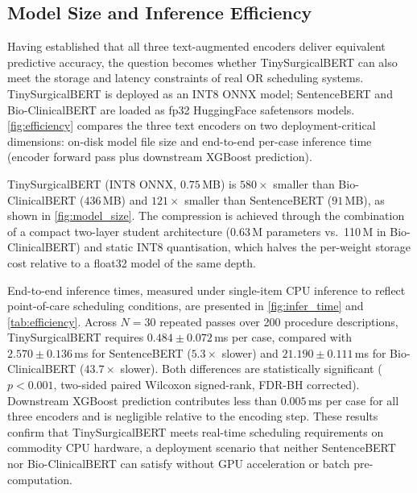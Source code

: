 \documentclass[3p]{elsarticle}
\begin{document}
\subsection{Model Size and Inference Efficiency}
\label{sec:runtime}

Having established that all three text-augmented encoders deliver equivalent predictive accuracy, the question becomes whether TinySurgicalBERT can also meet the storage and latency constraints of real OR scheduling systems. TinySurgicalBERT is deployed as an INT8 ONNX model; SentenceBERT and Bio-ClinicalBERT are loaded as fp32 HuggingFace safetensors models. \cref{fig:efficiency} compares the three text encoders on two deployment-critical dimensions: on-disk model file size and end-to-end per-case inference time (encoder forward pass plus downstream XGBoost prediction).

TinySurgicalBERT (INT8 ONNX, $0.75$\,MB) is $580\times$ smaller than Bio-ClinicalBERT ($436$\,MB) and $121\times$ smaller than SentenceBERT ($91$\,MB), as shown in \cref{fig:model_size}. The compression is achieved through the combination of a compact two-layer student architecture (0.63\,M parameters vs.\ 110\,M in Bio-ClinicalBERT) and static INT8 quantisation, which halves the per-weight storage cost relative to a float32 model of the same depth.

End-to-end inference times, measured under single-item CPU inference to reflect point-of-care scheduling conditions, are presented in \cref{fig:infer_time} and \cref{tab:efficiency}. Across $N = 30$ repeated passes over 200 procedure descriptions, TinySurgicalBERT requires $0.484 \pm 0.072$\,ms per case, compared with $2.570 \pm 0.136$\,ms for SentenceBERT ($5.3\times$ slower) and $21.190 \pm 0.111$\,ms for Bio-ClinicalBERT ($43.7\times$ slower). Both differences are statistically significant ($p < 0.001$, two-sided paired Wilcoxon signed-rank, FDR-BH corrected). Downstream XGBoost prediction contributes less than $0.005$\,ms per case for all three encoders and is negligible relative to the encoding step. These results confirm that TinySurgicalBERT meets real-time scheduling requirements on commodity CPU hardware, a deployment scenario that neither SentenceBERT nor Bio-ClinicalBERT can satisfy without GPU acceleration or batch pre-computation.
\end{document}
